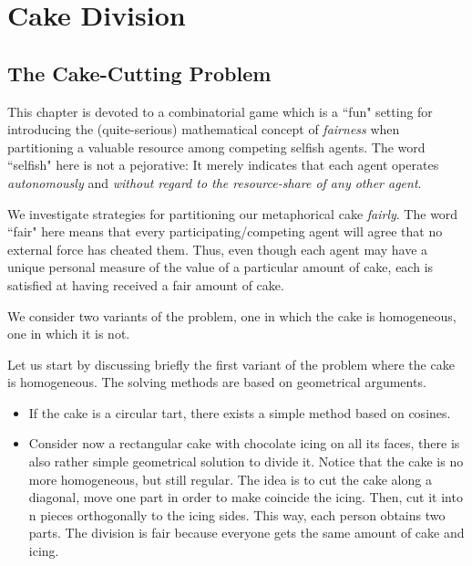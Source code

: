 
\chapter{Cake Division}
\label{Appendix:CakeDivision}

\section{The Cake-Cutting Problem}
\label{sec:cake-problem}

 

This chapter is devoted to a combinatorial game which is a ``fun" setting for introducing the (quite-serious) mathematical concept of {\em fairness} when partitioning a valuable resource among competing selfish agents.  The word ``selfish" here is not a pejorative: It merely indicates that each agent operates {\em autonomously} and {\em without regard to the resource-share of any other agent}.

\smallskip

We investigate strategies for partitioning our metaphorical cake \textit{fairly}.  The word ``fair" here means that every participating/competing agent will agree that no external force has cheated them.  Thus, even though each agent may have a unique personal measure of the value of a particular amount of cake, each is satisfied at having received a fair amount of cake. 

\medskip

We consider two variants of the problem, one in which the cake is homogeneous, one in which it is not. 

Let us start by discussing briefly the first variant of the problem where the cake is homogeneous. 
The solving methods are based on geometrical arguments. 
\begin{itemize}
\item If the cake is a circular tart, there exists a simple method based on cosines.
\item Consider now a rectangular cake with chocolate icing on all its faces, there is also rather simple geometrical solution to divide it. 
Notice that the cake is no more homogeneous, but still regular. 
The idea is to cut the cake along a diagonal, move one part in order to make coincide the icing.
Then, cut it into n pieces orthogonally to the icing sides. This way, each person obtains two parts. 
The division is fair because everyone gets the same amount of cake and icing. 
\end{itemize}

